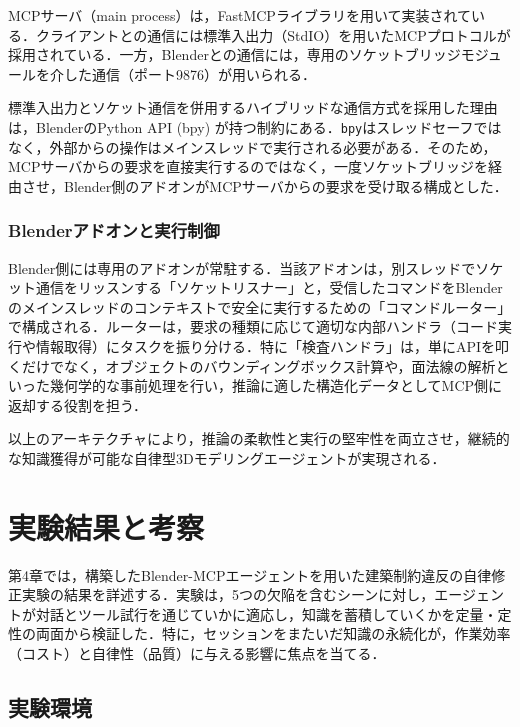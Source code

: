 \documentclass[dvipdfmx, a4paper, 9pt]{deimj}
\begin{document}
MCPサーバ（main process）は，FastMCPライブラリを用いて実装されている．クライアントとの通信には標準入出力（StdIO）を用いたMCPプロトコルが採用されている．一方，Blenderとの通信には，専用のソケットブリッジモジュールを介した通信（ポート9876）が用いられる．

標準入出力とソケット通信を併用するハイブリッドな通信方式を採用した理由は，BlenderのPython API (bpy) が持つ制約にある．\texttt{bpy}はスレッドセーフではなく，外部からの操作はメインスレッドで実行される必要がある．そのため，MCPサーバからの要求を直接実行するのではなく，一度ソケットブリッジを経由させ，Blender側のアドオンがMCPサーバからの要求を受け取る構成とした．

\subsubsection{Blenderアドオンと実行制御}

Blender側には専用のアドオンが常駐する．当該アドオンは，別スレッドでソケット通信をリッスンする「ソケットリスナー」と，受信したコマンドをBlenderのメインスレッドのコンテキストで安全に実行するための「コマンドルーター」で構成される．ルーターは，要求の種類に応じて適切な内部ハンドラ（コード実行や情報取得）にタスクを振り分ける．特に「検査ハンドラ」は，単にAPIを叩くだけでなく，オブジェクトのバウンディングボックス計算や，面法線の解析といった幾何学的な事前処理を行い，推論に適した構造化データとしてMCP側に返却する役割を担う．

以上のアーキテクチャにより，推論の柔軟性と実行の堅牢性を両立させ，継続的な知識獲得が可能な自律型3Dモデリングエージェントが実現される．

\section{実験結果と考察}

第4章では，構築したBlender-MCPエージェントを用いた建築制約違反の自律修正実験の結果を詳述する．実験は，5つの欠陥を含むシーンに対し，エージェントが対話とツール試行を通じていかに適応し，知識を蓄積していくかを定量・定性の両面から検証した．特に，セッションをまたいだ知識の永続化が，作業効率（コスト）と自律性（品質）に与える影響に焦点を当てる．

\subsection{実験環境}
\end{document}
